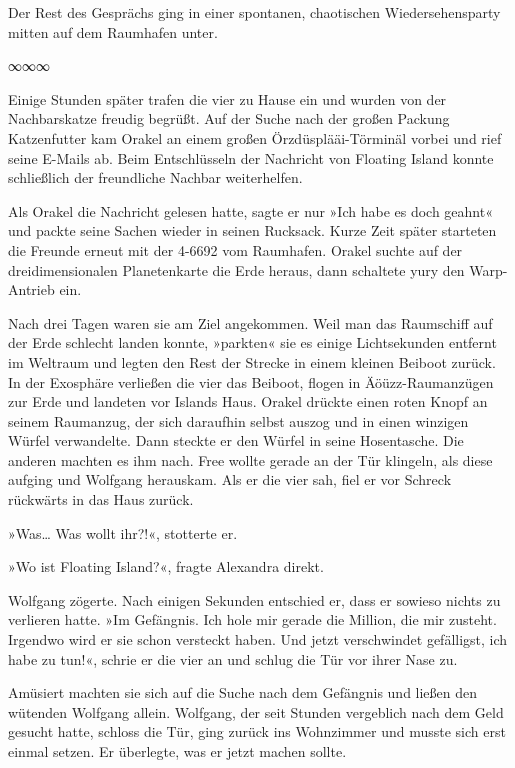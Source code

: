Der Rest des Gesprächs ging in einer spontanen, chaotischen Wiedersehensparty mitten auf dem Raumhafen unter.

\begin{center}
    ∞∞∞
\end{center}

Einige Stunden später trafen die vier zu Hause ein und wurden von der Nachbarskatze freudig begrüßt. Auf der Suche nach der großen Packung Katzenfutter kam Orakel an einem großen Örzdüsplääi-Törminäl vorbei und rief seine E-Mails ab. Beim Entschlüsseln der Nachricht von Floating Island konnte schließlich der freundliche Nachbar weiterhelfen.

Als Orakel die Nachricht gelesen hatte, sagte er nur »Ich habe es doch geahnt« und packte seine Sachen wieder in seinen Rucksack. Kurze Zeit später starteten die Freunde erneut mit der 4-6692 vom Raumhafen. Orakel suchte auf der dreidimensionalen Planetenkarte die Erde heraus, dann schaltete yury den Warp-Antrieb ein.

Nach drei Tagen waren sie am Ziel angekommen. Weil man das Raumschiff auf der Erde schlecht landen konnte, »parkten« sie es einige Lichtsekunden entfernt im Weltraum und legten den Rest der Strecke in einem kleinen Beiboot zurück. In der Exosphäre verließen die vier das Beiboot, flogen in Äöüzz-Raumanzügen zur Erde und landeten vor Islands Haus. Orakel drückte einen roten Knopf an seinem Raumanzug, der sich daraufhin selbst auszog und in einen winzigen Würfel verwandelte. Dann steckte er den Würfel in seine Hosentasche. Die anderen machten es ihm nach. Free wollte gerade an der Tür klingeln, als diese aufging und Wolfgang herauskam. Als er die vier sah, fiel er vor Schreck rückwärts in das Haus zurück.

»Was… Was wollt ihr?!«, stotterte er.

»Wo ist Floating Island?«, fragte Alexandra direkt.

Wolfgang zögerte. Nach einigen Sekunden entschied er, dass er sowieso nichts zu verlieren hatte. »Im Gefängnis. Ich hole mir gerade die Million, die mir zusteht. Irgendwo wird er sie schon versteckt haben. Und jetzt verschwindet gefälligst, ich habe zu tun!«, schrie er die vier an und schlug die Tür vor ihrer Nase zu.

Amüsiert machten sie sich auf die Suche nach dem Gefängnis und ließen den wütenden Wolfgang allein. Wolfgang, der seit Stunden vergeblich nach dem Geld gesucht hatte, schloss die Tür, ging zurück ins Wohnzimmer und musste sich erst einmal setzen. Er überlegte, was er jetzt machen sollte.


